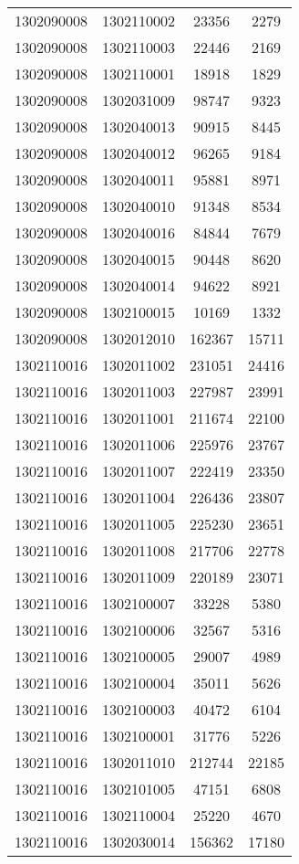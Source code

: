 \begin{longtable}[h]{llcc}
		1302090008 & 1302110002 & 23356 & 2279\\
		1302090008 & 1302110003 & 22446 & 2169\\
		1302090008 & 1302110001 & 18918 & 1829\\
		1302090008 & 1302031009 & 98747 & 9323\\
		1302090008 & 1302040013 & 90915 & 8445\\
		1302090008 & 1302040012 & 96265 & 9184\\
		1302090008 & 1302040011 & 95881 & 8971\\
		1302090008 & 1302040010 & 91348 & 8534\\
		1302090008 & 1302040016 & 84844 & 7679\\
		1302090008 & 1302040015 & 90448 & 8620\\
		1302090008 & 1302040014 & 94622 & 8921\\
		1302090008 & 1302100015 & 10169 & 1332\\
		1302090008 & 1302012010 & 162367 & 15711\\
		1302110016 & 1302011002 & 231051 & 24416\\
		1302110016 & 1302011003 & 227987 & 23991\\
		1302110016 & 1302011001 & 211674 & 22100\\
		1302110016 & 1302011006 & 225976 & 23767\\
		1302110016 & 1302011007 & 222419 & 23350\\
		1302110016 & 1302011004 & 226436 & 23807\\
		1302110016 & 1302011005 & 225230 & 23651\\
		1302110016 & 1302011008 & 217706 & 22778\\
		1302110016 & 1302011009 & 220189 & 23071\\
		1302110016 & 1302100007 & 33228 & 5380\\
		1302110016 & 1302100006 & 32567 & 5316\\
		1302110016 & 1302100005 & 29007 & 4989\\
		1302110016 & 1302100004 & 35011 & 5626\\
		1302110016 & 1302100003 & 40472 & 6104\\
		1302110016 & 1302100001 & 31776 & 5226\\
		1302110016 & 1302011010 & 212744 & 22185\\
		1302110016 & 1302101005 & 47151 & 6808\\
		1302110016 & 1302110004 & 25220 & 4670\\
		1302110016 & 1302030014 & 156362 & 17180\\

\end{longtable}
